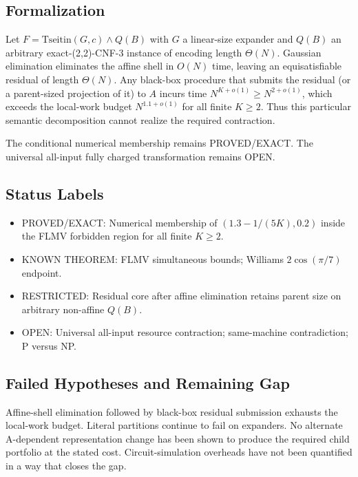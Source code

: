 \subsection{Formalization}
\begin{remark}
Let $F=\mathrm{Tseitin}(G,c)\land Q(B)$ with $G$ a linear-size expander and $Q(B)$ an arbitrary exact-(2,2)-CNF-3 instance of encoding length $\Theta(N)$. Gaussian elimination eliminates the affine shell in $O(N)$ time, leaving an equisatisfiable residual of length $\Theta(N)$. Any black-box procedure that submits the residual (or a parent-sized projection of it) to $A$ incurs time $N^{K+o(1)}\ge N^{2+o(1)}$, which exceeds the local-work budget $N^{1.1+o(1)}$ for all finite $K\ge 2$. Thus this particular semantic decomposition cannot realize the required contraction.
\end{remark}

The conditional numerical membership remains PROVED/EXACT. The universal all-input fully charged transformation remains OPEN.

\subsection{Status Labels}
\begin{itemize}
\item PROVED/EXACT: Numerical membership of $(1.3-1/(5K),0.2)$ inside the FLMV forbidden region for all finite $K\ge 2$.
\item KNOWN THEOREM: FLMV simultaneous bounds; Williams $2\cos(\pi/7)$ endpoint.
\item RESTRICTED: Residual core after affine elimination retains parent size on arbitrary non-affine $Q(B)$.
\item OPEN: Universal all-input resource contraction; same-machine contradiction; P versus NP.
\end{itemize}

\subsection{Failed Hypotheses and Remaining Gap}
Affine-shell elimination followed by black-box residual submission exhausts the local-work budget. Literal partitions continue to fail on expanders. No alternate A-dependent representation change has been shown to produce the required child portfolio at the stated cost. Circuit-simulation overheads have not been quantified in a way that closes the gap.

